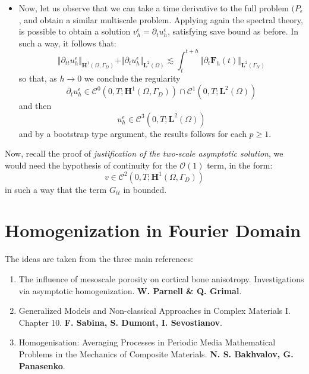 \begin{itemize}
    
    \item Now, let us observe that we can take a time derivative to the full problem $(P_{\epsilon}$, and obtain a similar multiscale problem. Applying again the spectral theory, is possible to obtain a solution $v_h^{\epsilon} = \partial_t u_h^{\epsilon}$, satisfying save bound as before. In such a way, it follows that:
    \begin{equation*}
        \Vert \partial_{tt} u_h^{\epsilon} \Vert_{\mathbf{H}^1(\Omega, \Gamma_D)} + \Vert \partial_t u_h^{\epsilon} \Vert_{\mathbf{L}^2 (\Omega)} \lesssim \int_t^{t+h} \Vert \partial_t \mathbf{F}_h(t) \Vert_{\mathbf{L}^2(\Gamma_N)}
    \end{equation*}
    so that, as $h \rightarrow 0$ we conclude the regularity
    \begin{equation*}
        \partial_t u_h^{\epsilon} \in \mathcal{C}^0(0,T;\mathbf{H}^1(\Omega, \Gamma_D)) \cap \mathcal{C}^1(0,T;\mathbf{L}^2(\Omega)) 
    \end{equation*}
    and then
    \begin{equation*}
        u_h^{\epsilon} \in \mathcal{C}^3(0,T; \mathbf{L}^2(\Omega))
    \end{equation*}
    and by a bootstrap type argument, the results follows for each $p \geq 1$.
\end{itemize}
\begin{rem}
Now, recall the proof of \textit{justification of the two-scale asymptotic solution}, we would need the hypothesis of continuity for the $\mathcal{O}(1)$ term, in the form:
\begin{equation*}
    v \in \mathcal{C}^2(0,T; \mathbf{H}^1(\Omega, \Gamma_D))
\end{equation*}
in such a way that the term $G_{tt}$ in bounded.
\end{rem}



\section{Homogenization in Fourier Domain}

The ideas are taken from the three main references:
\begin{enumerate}
    \item The influence of mesoscale porosity on cortical bone anisotropy. Investigations via asymptotic homogenization. \textbf{W. Parnell \& Q. Grimal}.
    \item Generalized Models and Non-classical Approaches in Complex Materials I. Chapter 10. \textbf{F. Sabina, S. Dumont, I. Sevostianov}.
    \item Homogenisation: Averaging Processes in Periodic Media Mathematical Problems in the Mechanics of Composite Materials. \textbf{N. S. Bakhvalov, G. Panasenko}.
\end{enumerate}

